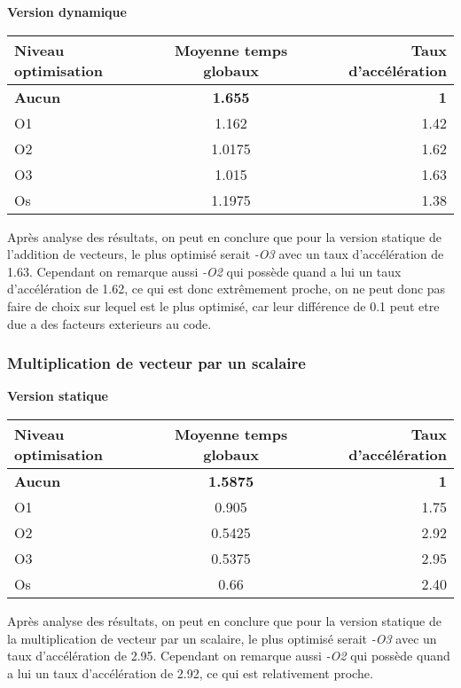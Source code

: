 \documentclass{rapport}
\begin{document}
\textbf{Version dynamique}
\begin{center}
    \begin{tabular}{ l|c|r }
        Niveau optimisation & Moyenne temps globaux & Taux d'accélération \\
        \hline
        \textbf{Aucun} & \textbf{1.655} & \textbf{1} \\
        O1 & 1.162 & 1.42 \\
        O2 & 1.0175 & 1.62 \\
        O3 & 1.015 & 1.63 \\
        Os & 1.1975 & 1.38
    \end{tabular}
\end{center}
Après analyse des résultats, on peut en conclure que pour la version statique de l'addition de vecteurs, le plus optimisé serait \textit{-O3} avec un taux d'accélération de 1.63.
\newline Cependant on remarque aussi \textit{-O2} qui possède quand a lui un taux d'accélération de 1.62, ce qui est donc extrêmement proche, on ne peut donc pas faire de choix sur lequel est le plus optimisé, car leur différence de 0.1 peut etre due a des facteurs exterieurs au code.


\subsubsection{Multiplication de vecteur par un scalaire}
\textbf{Version statique}
\begin{center}
    \begin{tabular}{ l|c|r }
        Niveau optimisation & Moyenne temps globaux & Taux d'accélération \\
        \hline
        \textbf{Aucun} & \textbf{1.5875} & \textbf{1} \\
        O1 & 0.905 & 1.75 \\
        O2 & 0.5425 & 2.92 \\
        O3 & 0.5375 & 2.95 \\
        Os & 0.66 & 2.40
    \end{tabular}
\end{center}
Après analyse des résultats, on peut en conclure que pour la version statique de la multiplication de vecteur par un scalaire, le plus optimisé serait \textit{-O3} avec un taux d'accélération de 2.95.
\newline Cependant on remarque aussi \textit{-O2} qui possède quand a lui un taux d'accélération de 2.92, ce qui est relativement proche.
\end{document}
